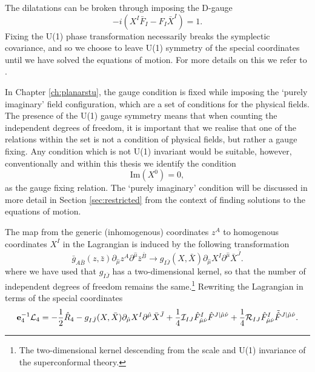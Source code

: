 The dilatations can be broken through imposing the D-gauge
\begin{equation}
\label{eq:dgauge1}
-i(X^I \bar{F}_I - F_I\bar{X}^I) = 1.
\end{equation}
Fixing the U(1) phase transformation necessarily breaks the symplectic covariance, and so we choose to leave U(1) symmetry of the special coordinates until we have solved the equations of motion. For more details on this we refer to \cite{Mohaupt:2011aa, Vaughan:2012}. 

In Chapter \ref{ch:planarstu}, the gauge condition is fixed while imposing the `purely imaginary' field configuration, which are a set of conditions for the physical fields. The presence of the U(1) gauge symmetry means that when counting the independent degrees of freedom, it is important that we realise that one of the relations within the set is not a condition of physical fields, but rather a gauge fixing. Any condition which is not U(1) invariant would be suitable, however, conventionally and within this thesis we identify the condition
\begin{equation*}
	\text{Im}(X^0) = 0,
\end{equation*}
as the gauge fixing relation. The `purely imaginary' condition will be discussed in more detail in Section \ref{sec:restricted} from the context of finding solutions to the equations of motion.

The map from the generic (inhomogenous) coordinates $z^A$ to homogenous coordinates $X^I$ in the Lagrangian is induced by the following transformation
\begin{equation}
\bar{g}_{A\bar{B}} (z,\bar{z}) \partial_{\hat{\mu}} z^A \partial^{\hat{\mu}} \bar{z}^{\bar{B}} \rightarrow g_{I\bar{J}} (X,\bar{X}) \partial_{\hat{\mu}} X^I \partial^{\hat{\mu}} \bar{X}^{\bar{J}}.
\end{equation}
where we have used that $g_{I\bar{J}}$ has a two-dimensional kernel, so that the number of independent degrees of freedom remains the same.\footnote{The two-dimensional kernel descending from the scale and U(1) invariance of the superconformal theory.} Rewriting the Lagrangian  in terms of the special coordinates
\begin{equation}
\mathbf{e}_4^{-1} {\cal L}_4 = -\frac{1}{2}\hat{R}_4 - g_{I\bar{J}} (X,\bar{X}) \partial_{\hat{\mu}} X^I \partial^{\hat{\mu}} \bar{X}^{\bar{J}} + \frac{1}{4} {\cal I}_{IJ} \hat{F}_{\hat{\mu}\hat{\nu}}^I \hat{F}^{J|\hat{\mu}\hat{\nu}} + \frac{1}{4} {\cal R}_{IJ} \hat{F}_{\hat{\mu}\hat{\nu}}^I \tilde{\hat{F}}^{J|\hat{\mu}\hat{\nu}}.
\end{equation}

